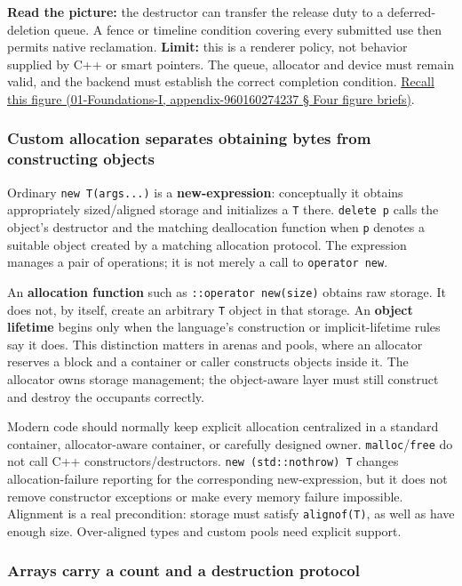 \textbf{Read the picture:} the destructor can transfer the release duty to a deferred-deletion queue. A fence or timeline condition covering every submitted use then permits native reclamation. \textbf{Limit:} this is a renderer policy, not behavior supplied by C++ or smart pointers. The queue, allocator and device must remain valid, and the backend must establish the correct completion condition. \href{}{Recall this figure (01-Foundations-I, appendix-960160274237 § Four figure briefs)}.

\subsubsection{Custom allocation separates obtaining bytes from constructing objects}\label{custom-allocation-separates-obtaining-bytes-from-constructing-objects}

Ordinary \texttt{new\ T(args...)} is a \textbf{new-expression}: conceptually it obtains appropriately sized/aligned storage and initializes a \texttt{T} there. \texttt{delete\ p} calls the object's destructor and the matching deallocation function when \texttt{p} denotes a suitable object created by a matching allocation protocol. The expression manages a pair of operations; it is not merely a call to \texttt{operator\ new}.

An \textbf{allocation function} such as \texttt{::operator\ new(size)} obtains raw storage. It does not, by itself, create an arbitrary \texttt{T} object in that storage. An \textbf{object lifetime} begins only when the language's construction or implicit-lifetime rules say it does. This distinction matters in arenas and pools, where an allocator reserves a block and a container or caller constructs objects inside it. The allocator owns storage management; the object-aware layer must still construct and destroy the occupants correctly.

Modern code should normally keep explicit allocation centralized in a standard container, allocator-aware container, or carefully designed owner. \texttt{malloc}/\texttt{free} do not call C++ constructors/destructors. \texttt{new\ (std::nothrow)\ T} changes allocation-failure reporting for the corresponding new-expression, but it does not remove constructor exceptions or make every memory failure impossible. Alignment is a real precondition: storage must satisfy \texttt{alignof(T)}, as well as have enough size. Over-aligned types and custom pools need explicit support.

\subsubsection{Arrays carry a count and a destruction protocol}\label{arrays-carry-a-count-and-a-destruction-protocol}

